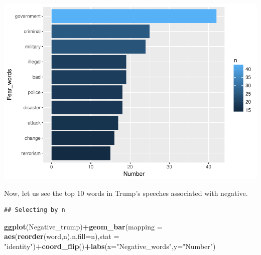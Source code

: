 \documentclass[]{article}
\newenvironment{Shaded}{\begin{snugshade}}{\end{snugshade}}
\newcommand{\KeywordTok}[1]{\textcolor[rgb]{0.13,0.29,0.53}{\textbf{#1}}}
\newcommand{\DataTypeTok}[1]{\textcolor[rgb]{0.13,0.29,0.53}{#1}}
\newcommand{\DecValTok}[1]{\textcolor[rgb]{0.00,0.00,0.81}{#1}}
\newcommand{\StringTok}[1]{\textcolor[rgb]{0.31,0.60,0.02}{#1}}
\newcommand{\OperatorTok}[1]{\textcolor[rgb]{0.81,0.36,0.00}{\textbf{#1}}}
\newcommand{\NormalTok}[1]{#1}
\begin{document}
\includegraphics{Donald_Trump_Speech_sentiment_analysis_files/figure-latex/unnamed-chunk-31-1.pdf}

Now, let us see the top 10 words in Trump's speeches associated with
negative.

\begin{Shaded}
\end{Shaded}

\begin{verbatim}
## Selecting by n
\end{verbatim}

\begin{Shaded}
\begin{Highlighting}[]
\KeywordTok{ggplot}\NormalTok{(Negative_trump)}\OperatorTok{+}\KeywordTok{geom_bar}\NormalTok{(}\DataTypeTok{mapping =} \KeywordTok{aes}\NormalTok{(}\KeywordTok{reorder}\NormalTok{(word,n),n,}\DataTypeTok{fill=}\NormalTok{n),}\DataTypeTok{stat =} \StringTok{"identity"}\NormalTok{)}\OperatorTok{+}\KeywordTok{coord_flip}\NormalTok{()}\OperatorTok{+}\KeywordTok{labs}\NormalTok{(}\DataTypeTok{x=}\StringTok{"Negative_words"}\NormalTok{,}\DataTypeTok{y=}\StringTok{"Number"}\NormalTok{)}
\end{Highlighting}
\end{Shaded}
\end{document}
